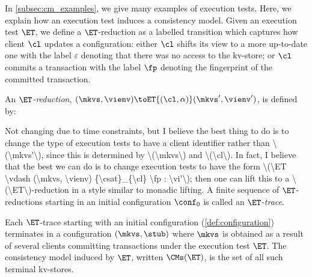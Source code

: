 In \cref{subsec:cm_examples}, we give many examples of execution tests. Here, we
explain how an execution test induces a consistency model. Given an execution test \(\ET\), 
we define a \(\ET\)-reduction as a labelled transition which captures how
client \(\cl\) updates a  configuration:  either  \(\cl\)
shifts its view to a more up-to-date one
with  the label \(\varepsilon\) denoting  that 
	there was no access to the kv-store; or  \(\cl\) 
	commits a transaction with the label \(\fp\)  denoting the
        fingerprint of the committed transaction.

\begin{definition}[ET-reduction]
An \emph{\(\ET\)-reduction}, \((\mkvs, \vienv) \toET{(\cl, \alpha)} (\mkvs', \vienv')\), is defined by:
\ac{Not changing due to time constraints, but I believe the best thing to do is to change the type of execution tests to have a client identifier 
rather than \(\mkvs'\), since this is determined by \(\mkvs\) and \(\cl\). In fact, I believe that the best we can do is to change execution tests to 
have the form \(\ET \vdash (\mkvs, \vienv) {\csat}_{\cl} \fp : \vi'\); then one can lift this to a \(\ET\)-reduction in a style similar to monadic lifting.}
A finite sequence of \(\ET\)-reductions starting in an
initial configuration \(\conf_{0}\) is called  an \emph{\(\ET\)-trace}. 
\end{definition}
Each \(\ET\)-trace  starting with an initial configuration
(\cref{def:configuration}) terminates in a configuration \((\mkvs, \stub)\) where \(\mkvs\) is obtained as a result of several clients committing transactions under the 
execution test \(\ET\). The consistency model induced by \(\ET\), 
written \(\CMs(\ET)\), is the set of all such terminal kv-stores.
%
